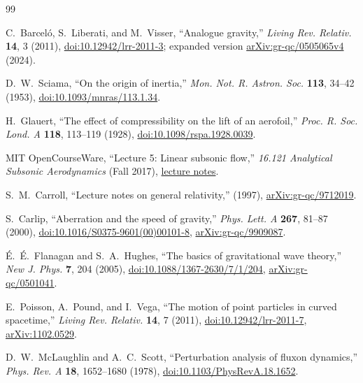 \documentclass[11pt,a4paper]{article}
\numberwithin{equation}{section}
\begin{document}
\clearpage
\begin{thebibliography}{99}

C.~Barcel\'o, S.~Liberati, and M.~Visser,
``Analogue gravity,''
\emph{Living Rev. Relativ.} \textbf{14}, 3 (2011),
\href{https://doi.org/10.12942/lrr-2011-3}{doi:10.12942/lrr-2011-3};
expanded version \href{https://arxiv.org/abs/gr-qc/0505065v4}{arXiv:gr-qc/0505065v4} (2024).

D.~W.~Sciama,
``On the origin of inertia,''
\emph{Mon. Not. R. Astron. Soc.} \textbf{113}, 34--42 (1953),
\href{https://doi.org/10.1093/mnras/113.1.34}{doi:10.1093/mnras/113.1.34}.

H.~Glauert,
``The effect of compressibility on the lift of an aerofoil,''
\emph{Proc. R. Soc. Lond. A} \textbf{118}, 113--119 (1928),
\href{https://doi.org/10.1098/rspa.1928.0039}{doi:10.1098/rspa.1928.0039}.

MIT OpenCourseWare,
``Lecture 5: Linear subsonic flow,''
\emph{16.121 Analytical Subsonic Aerodynamics} (Fall 2017),
\href{https://ocw.mit.edu/courses/16-121-analytical-subsonic-aerodynamics-fall-2017/49059b8f1a4532d90aae47c509a93686_MIT16_121F17_lec05.pdf}{lecture notes}.

S.~M.~Carroll,
``Lecture notes on general relativity,'' (1997),
\href{https://arxiv.org/abs/gr-qc/9712019}{arXiv:gr-qc/9712019}.

S.~Carlip,
``Aberration and the speed of gravity,''
\emph{Phys. Lett. A} \textbf{267}, 81--87 (2000),
\href{https://doi.org/10.1016/S0375-9601(00)00101-8}{doi:10.1016/S0375-9601(00)00101-8},
\href{https://arxiv.org/abs/gr-qc/9909087}{arXiv:gr-qc/9909087}.

\'E.~\'E.~Flanagan and S.~A.~Hughes,
``The basics of gravitational wave theory,''
\emph{New J. Phys.} \textbf{7}, 204 (2005),
\href{https://doi.org/10.1088/1367-2630/7/1/204}{doi:10.1088/1367-2630/7/1/204},
\href{https://arxiv.org/abs/gr-qc/0501041}{arXiv:gr-qc/0501041}.

E.~Poisson, A.~Pound, and I.~Vega,
``The motion of point particles in curved spacetime,''
\emph{Living Rev. Relativ.} \textbf{14}, 7 (2011),
\href{https://doi.org/10.12942/lrr-2011-7}{doi:10.12942/lrr-2011-7},
\href{https://arxiv.org/abs/1102.0529}{arXiv:1102.0529}.

D.~W.~McLaughlin and A.~C.~Scott,
``Perturbation analysis of fluxon dynamics,''
\emph{Phys. Rev. A} \textbf{18}, 1652--1680 (1978),
\href{https://doi.org/10.1103/PhysRevA.18.1652}{doi:10.1103/PhysRevA.18.1652}.


\end{thebibliography}
\end{document}
